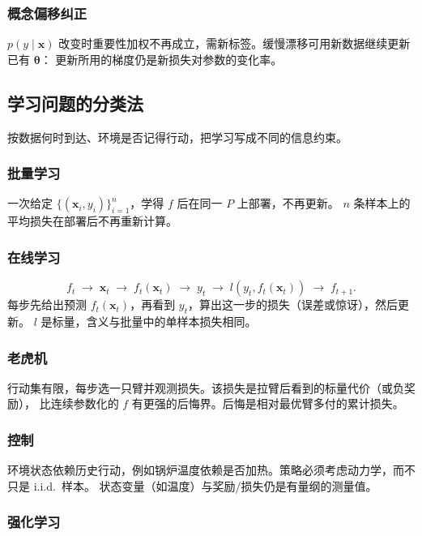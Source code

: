 \subsubsection{概念偏移纠正}

$p(y\mid\bm{x})$ 改变时重要性加权不再成立，需新标签。缓慢漂移可用新数据继续更新已有 $\bm{\theta}$：
更新所用的梯度仍是新损失对参数的变化率。

\subsection{学习问题的分类法}

按数据何时到达、环境是否记得行动，把学习写成不同的信息约束。

\subsubsection{批量学习}

一次给定 $\{(\bm{x}_{i},y_{i})\}_{i=1}^{n}$，学得 $f$ 后在同一 $P$ 上部署，不再更新。
$n$ 条样本上的平均损失在部署后不再重新计算。

\subsubsection{在线学习}

\[
f_{t}
\;\longrightarrow\;
\bm{x}_{t}
\;\longrightarrow\;
f_{t}(\bm{x}_{t})
\;\longrightarrow\;
y_{t}
\;\longrightarrow\;
l(y_{t},f_{t}(\bm{x}_{t}))
\;\longrightarrow\;
f_{t+1}.
\]
每步先给出预测 $f_t(\bm{x}_t)$，再看到 $y_t$，算出这一步的损失（误差或惊讶），然后更新。
$l$ 是标量，含义与批量中的单样本损失相同。

\subsubsection{老虎机}

行动集有限，每步选一只臂并观测损失。该损失是拉臂后看到的标量代价（或负奖励），
比连续参数化的 $f$ 有更强的后悔界。后悔是相对最优臂多付的累计损失。

\subsubsection{控制}

环境状态依赖历史行动，例如锅炉温度依赖是否加热。策略必须考虑动力学，而不只是 i.i.d.\ 样本。
状态变量（如温度）与奖励/损失仍是有量纲的测量值。

\subsubsection{强化学习}

